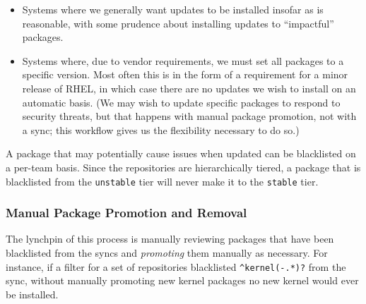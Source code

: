 \begin{itemize}
\item Systems where we generally want updates to be installed insofar
  as is reasonable, with some prudence about installing updates to
  ``impactful'' packages.
\item Systems where, due to vendor requirements, we must set all
  packages to a specific version.  Most often this is in the form of a
  requirement for a minor release of RHEL, in which case there are no updates we wish
  to install on an automatic basis.  (We may wish to update specific
  packages to respond to security threats, but that happens with
  manual package promotion, not with a sync; this workflow gives us
  the flexibility necessary to do so.)
\end{itemize}

A package that may potentially cause issues when updated can be
blacklisted on a per-team basis. Since the repositories are hierarchically
tiered, a package that is blacklisted from the \texttt{unstable} tier
will never make it to the \texttt{stable} tier.

\subsubsection{Manual Package Promotion and Removal}

The lynchpin of this process is manually reviewing packages that have
been blacklisted from the syncs and \emph{promoting} them manually as
necessary.  For instance, if a filter for a set of repositories
blacklisted \texttt{\^{}kernel(-.*)?} from the sync, without manually
promoting new kernel packages no new kernel would ever be installed.

